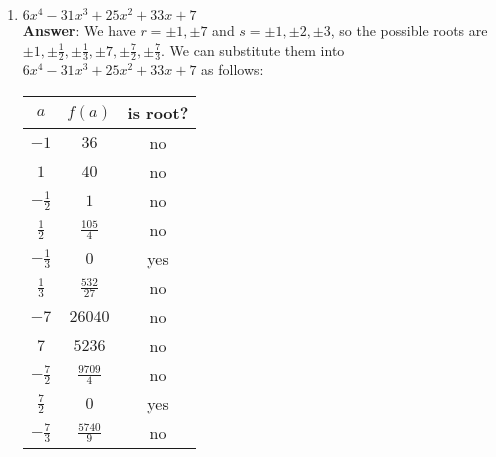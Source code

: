 \documentclass{article}
\begin{document}
\begin{enumerate}
\begin{enumerate}[start=2]
                  \item $6x^4-31x^3+25x^2+33x+7$\\
                        \textbf{Answer}: We have $r=\pm 1, \pm 7$ and $s=\pm 1, \pm 2, \pm 3$, so the possible roots are $\pm 1,\pm\frac{1}{2},\pm\frac{1}{3},\pm 7,\pm\frac{7}{2},\pm\frac{7}{3}$. We can substitute them into $6x^4-31x^3+25x^2+33x+7$ as follows:
                        \begin{center}
                              \begin{tabular}{|c|c|c|}
                                    \hline
                                    $a$            & $f(a)$           & is root? \\
                                    \hline
                                    $-1$           & $36$             & no       \\
                                    \hline
                                    $1$            & $40$             & no       \\
                                    \hline
                                    $-\frac{1}{2}$ & $1$              & no       \\
                                    \hline
                                    $\frac{1}{2}$  & $\frac{105}{4}$  & no       \\
                                    \hline
                                    $-\frac{1}{3}$ & $0$              & yes      \\
                                    \hline
                                    $\frac{1}{3}$  & $\frac{532}{27}$ & no       \\
                                    \hline
                                    $-7$           & $26040$          & no       \\
                                    \hline
                                    $7$            & $5236$           & no       \\
                                    \hline
                                    $-\frac{7}{2}$ & $\frac{9709}{4}$ & no       \\
                                    \hline
                                    $\frac{7}{2}$  & $0$              & yes      \\
                                    \hline
                                    $-\frac{7}{3}$ & $\frac{5740}{9}$ & no       \\
                                    \hline

\end{tabular}
\end{center}
\end{enumerate}
\end{enumerate}
\end{document}
